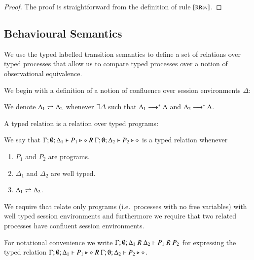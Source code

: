 \begin{proof}
	The proof is straightforward from the definition of rule ${\footnotesize [\textrm{RRcv}]}$.
\end{proof}

\subsection{Behavioural Semantics}

We use the typed labelled transition semantics to define
a set of relations over typed processes that allow us to compare
typed processes over a notion of observational equivalence.


We begin with a definition of a notion of confluence
over session environments $\Delta$:
\begin{definition}\rm
	We denote $\Delta_1 \rightleftharpoons \Delta_2$ whenever $\exists \Delta$ such that
	$\Delta_1 \longrightarrow^* \Delta$ and $\Delta_2 \longrightarrow^* \Delta$.
\end{definition}


A typed relation is a relation over typed programs:

\begin{definition}\rm
	We say that
	$\Gamma; \emptyset; \Delta_1 \vdash P_1 \triangleright \diamond\ R\ \Gamma; \emptyset; \Delta_2 \vdash P_2 \triangleright \diamond$
	is a typed relation whenever
	\begin{enumerate}
		\item	$P_1$ and $P_2$ are programs.
		\item	$\Delta_1$ and $\Delta_2$ are well typed.
		\item	$\Delta_1 \rightleftharpoons \Delta_2$.
	\end{enumerate}
\end{definition}

We require that relate only programs (i.e.\ processes with no free variables) with
well typed session environments and furthermore we require that two related processes
have confluent session environments.

For notational convenience we write
$\horel{\Gamma}{\Delta_1}{P_1}{\ R\ }{\Delta_2}{P_2}$
for expressing the typed relation $\Gamma; \emptyset; \Delta_1 \vdash P_1 \triangleright \diamond\ R\ \Gamma; \emptyset; \Delta_2 \vdash P_2 \triangleright \diamond$.

